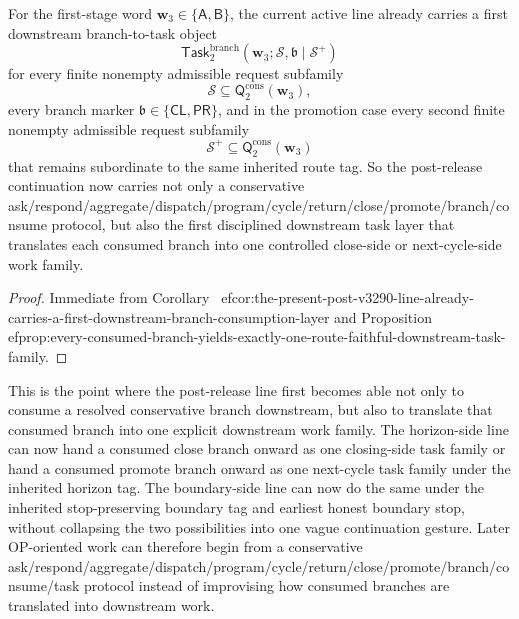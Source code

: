 \begin{corollary}
\label{cor:the-present-post-v3290-line-already-carries-a-first-downstream-branch-to-task-layer}
For the first-stage word \(\mathbf w_3\in\{\mathsf A,\mathsf B\}\), the current active line already carries a first downstream branch-to-task object
\[
  \mathsf{Task}^{\mathrm{branch}}_{2}(\mathbf w_3;\mathcal S,\mathfrak b\mid\mathcal S^{+})
\]
for every finite nonempty admissible request subfamily
\[
  \mathcal S\subseteq \mathsf{Q}^{\mathrm{cons}}_{2}(\mathbf w_3),
\]
every branch marker \(\mathfrak b\in\{\mathsf{CL},\mathsf{PR}\}\), and in the promotion case every second finite nonempty admissible request subfamily
\[
  \mathcal S^{+}\subseteq \mathsf{Q}^{\mathrm{cons}}_{2}(\mathbf w_3)
\]
that remains subordinate to the same inherited route tag. So the post-release continuation now carries not only a conservative ask/respond/aggregate/dispatch/program/cycle/return/close/promote/branch/consume protocol, but also the first disciplined downstream task layer that translates each consumed branch into one controlled close-side or next-cycle-side work family.
\end{corollary}

\begin{proof}
Immediate from Corollary~
ef{cor:the-present-post-v3290-line-already-carries-a-first-downstream-branch-consumption-layer} and Proposition~
ef{prop:every-consumed-branch-yields-exactly-one-route-faithful-downstream-task-family}.
\end{proof}

\begin{remark}
\label{rem:what-the-first-downstream-branch-to-task-layer-now-buys}
This is the point where the post-release line first becomes able not only to consume a resolved conservative branch downstream, but also to translate that consumed branch into one explicit downstream work family. The horizon-side line can now hand a consumed close branch onward as one closing-side task family or hand a consumed promote branch onward as one next-cycle task family under the inherited horizon tag. The boundary-side line can now do the same under the inherited stop-preserving boundary tag and earliest honest boundary stop, without collapsing the two possibilities into one vague continuation gesture. Later OP-oriented work can therefore begin from a conservative ask/respond/aggregate/dispatch/program/cycle/return/close/promote/branch/consume/task protocol instead of improvising how consumed branches are translated into downstream work.
\end{remark}




